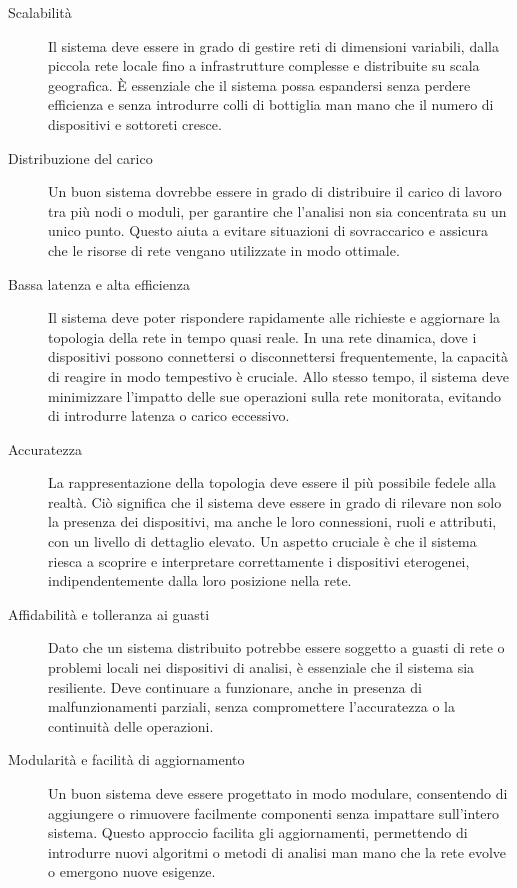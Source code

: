 \documentclass[target=bach,aauheader=,style=]{thud}
\begin{document}
\begin{description}
  \item[Scalabilità]
  Il sistema deve essere in grado di gestire reti di dimensioni variabili, dalla piccola rete locale fino a infrastrutture complesse e distribuite su scala geografica. È essenziale che il sistema possa espandersi senza perdere efficienza e senza introdurre colli di bottiglia man mano che il numero di dispositivi e sottoreti cresce.

  \item[Distribuzione del carico]
  Un buon sistema dovrebbe essere in grado di distribuire il carico di lavoro tra più nodi o moduli, per garantire che l'analisi non sia concentrata su un unico punto. Questo aiuta a evitare situazioni di sovraccarico e assicura che le risorse di rete vengano utilizzate in modo ottimale.

  \item[Bassa latenza e alta efficienza]
  Il sistema deve poter rispondere rapidamente alle richieste e aggiornare la topologia della rete in tempo quasi reale. In una rete dinamica, dove i dispositivi possono connettersi o disconnettersi frequentemente, la capacità di reagire in modo tempestivo è cruciale. Allo stesso tempo, il sistema deve minimizzare l'impatto delle sue operazioni sulla rete monitorata, evitando di introdurre latenza o carico eccessivo.

  \item[Accuratezza]
  La rappresentazione della topologia deve essere il più possibile fedele alla realtà. Ciò significa che il sistema deve essere in grado di rilevare non solo la presenza dei dispositivi, ma anche le loro connessioni, ruoli e attributi, con un livello di dettaglio elevato. Un aspetto cruciale è che il sistema riesca a scoprire e interpretare correttamente i dispositivi eterogenei, indipendentemente dalla loro posizione nella rete.

  \item[Affidabilità e tolleranza ai guasti]
  Dato che un sistema distribuito potrebbe essere soggetto a guasti di rete o problemi locali nei dispositivi di analisi, è essenziale che il sistema sia resiliente. Deve continuare a funzionare, anche in presenza di malfunzionamenti parziali, senza compromettere l'accuratezza o la continuità delle operazioni.

  \item[Modularità e facilità di aggiornamento]
  Un buon sistema deve essere progettato in modo modulare, consentendo di aggiungere o rimuovere facilmente componenti senza impattare sull'intero sistema. Questo approccio facilita gli aggiornamenti, permettendo di introdurre nuovi algoritmi o metodi di analisi man mano che la rete evolve o emergono nuove esigenze.


\end{description}
\end{document}
